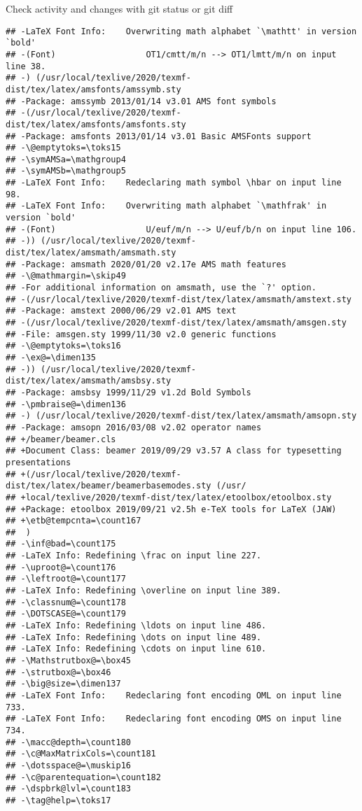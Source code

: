 \documentclass[ignorenonframetext,]{beamer}
\begin{document}
\begin{frame}[fragile]{Check activity and changes with git status or git
diff}
\begin{verbatim}
## -LaTeX Font Info:    Overwriting math alphabet `\mathtt' in version `bold'
## -(Font)                  OT1/cmtt/m/n --> OT1/lmtt/m/n on input line 38.
## -) (/usr/local/texlive/2020/texmf-dist/tex/latex/amsfonts/amssymb.sty
## -Package: amssymb 2013/01/14 v3.01 AMS font symbols
## -(/usr/local/texlive/2020/texmf-dist/tex/latex/amsfonts/amsfonts.sty
## -Package: amsfonts 2013/01/14 v3.01 Basic AMSFonts support
## -\@emptytoks=\toks15
## -\symAMSa=\mathgroup4
## -\symAMSb=\mathgroup5
## -LaTeX Font Info:    Redeclaring math symbol \hbar on input line 98.
## -LaTeX Font Info:    Overwriting math alphabet `\mathfrak' in version `bold'
## -(Font)                  U/euf/m/n --> U/euf/b/n on input line 106.
## -)) (/usr/local/texlive/2020/texmf-dist/tex/latex/amsmath/amsmath.sty
## -Package: amsmath 2020/01/20 v2.17e AMS math features
## -\@mathmargin=\skip49
## -For additional information on amsmath, use the `?' option.
## -(/usr/local/texlive/2020/texmf-dist/tex/latex/amsmath/amstext.sty
## -Package: amstext 2000/06/29 v2.01 AMS text
## -(/usr/local/texlive/2020/texmf-dist/tex/latex/amsmath/amsgen.sty
## -File: amsgen.sty 1999/11/30 v2.0 generic functions
## -\@emptytoks=\toks16
## -\ex@=\dimen135
## -)) (/usr/local/texlive/2020/texmf-dist/tex/latex/amsmath/amsbsy.sty
## -Package: amsbsy 1999/11/29 v1.2d Bold Symbols
## -\pmbraise@=\dimen136
## -) (/usr/local/texlive/2020/texmf-dist/tex/latex/amsmath/amsopn.sty
## -Package: amsopn 2016/03/08 v2.02 operator names
## +/beamer/beamer.cls
## +Document Class: beamer 2019/09/29 v3.57 A class for typesetting presentations
## +(/usr/local/texlive/2020/texmf-dist/tex/latex/beamer/beamerbasemodes.sty (/usr/
## +local/texlive/2020/texmf-dist/tex/latex/etoolbox/etoolbox.sty
## +Package: etoolbox 2019/09/21 v2.5h e-TeX tools for LaTeX (JAW)
## +\etb@tempcnta=\count167
##  )
## -\inf@bad=\count175
## -LaTeX Info: Redefining \frac on input line 227.
## -\uproot@=\count176
## -\leftroot@=\count177
## -LaTeX Info: Redefining \overline on input line 389.
## -\classnum@=\count178
## -\DOTSCASE@=\count179
## -LaTeX Info: Redefining \ldots on input line 486.
## -LaTeX Info: Redefining \dots on input line 489.
## -LaTeX Info: Redefining \cdots on input line 610.
## -\Mathstrutbox@=\box45
## -\strutbox@=\box46
## -\big@size=\dimen137
## -LaTeX Font Info:    Redeclaring font encoding OML on input line 733.
## -LaTeX Font Info:    Redeclaring font encoding OMS on input line 734.
## -\macc@depth=\count180
## -\c@MaxMatrixCols=\count181
## -\dotsspace@=\muskip16
## -\c@parentequation=\count182
## -\dspbrk@lvl=\count183
## -\tag@help=\toks17

\end{verbatim}
\end{frame}
\end{document}
